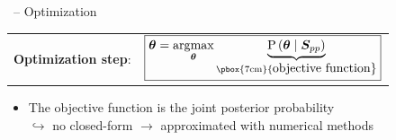 \documentclass[10pt,xcolor=x11names,compress, show notes]{beamer}%
\begin{document}
\begin{frame}{\insertsectionhead ~-- Optimization}
	\centering
	\vfill	
	\begin{tabular}{c c}
		\textbf{Optimization step}:&
		$\boxed{ \displaystyle  \bm{\theta} =\underset{\bm{\theta}}{\arg\!\max} \underbrace{\text{P} \left( \bm{\theta} \mid \bm{S}_{pp}\right)}_{ \text{\pbox{7cm}{\centering \normalsize objective function}}}}$ %
	\end{tabular}
	\vfill
	\flushleft
	\begin{itemize}
        		\item The objective function is the joint posterior probability\\  $\hookrightarrow$ no closed-form	$\rightarrow$ approximated with numerical methods
\end{itemize}
	
	


\end{frame}
\end{document}
